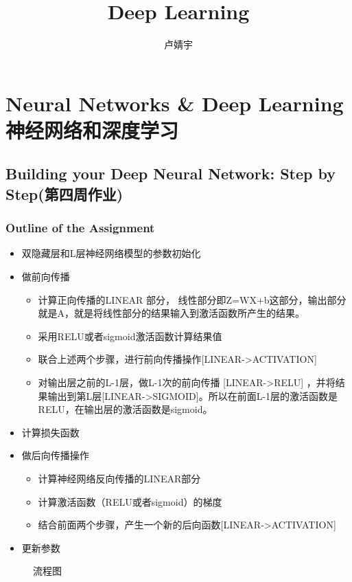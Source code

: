 \documentclass[UTF8]{ctexart}
\title{\heiti Deep Learning}
\author{卢婧宇}
\begin{document}
\maketitle
\tableofcontents

\newpage
\section {Neural Networks \& Deep Learning 神经网络和深度学习}
\subsection{Building your Deep Neural Network: Step by Step(第四周作业)}
\subsubsection{Outline of the Assignment}
\begin{itemize}
  \item 双隐藏层和L层神经网络模型的参数初始化
  \item 做前向传播
  \begin{itemize}
    \item 计算正向传播的LINEAR 部分，
    线性部分即Z=WX+b这部分，输出部分就是A，就是将线性部分的结果输入到激活函数所产生的结果。
    \item 采用RELU或者sigmoid激活函数计算结果值
    \item 联合上述两个步骤，进行前向传播操作[LINEAR->ACTIVATION]
    \item 对输出层之前的L-1层，做L-1次的前向传播 [LINEAR->RELU] ，并将结果输出到第L层[LINEAR->SIGMOID]。所以在前面L-1层的激活函数是RELU，在输出层的激活函数是sigmoid。
  \end{itemize}
  \item 计算损失函数
  \item 做后向传播操作
  \begin{itemize}
    \item 计算神经网络反向传播的LINEAR部分
    \item 计算激活函数（RELU或者sigmoid）的梯度
    \item 结合前面两个步骤，产生一个新的后向函数[LINEAR->ACTIVATION]
  \end{itemize}
  \item 更新参数
\end{itemize}

\begin{figure}[htb]
 \caption{流程图}
 \label{fig:1}
 \end{figure}
\end{document}
